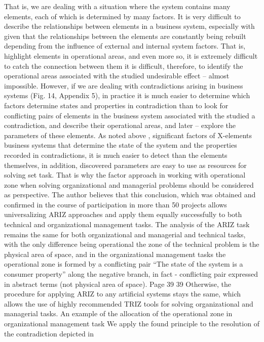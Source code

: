 That is, we are dealing with a situation where the system contains many
elements, each of which is determined by many factors.
It is very difficult to describe the relationships between elements in a business system, especially with
given that the relationships between the elements are constantly being rebuilt depending
from the influence of external and internal system factors. That is, highlight
elements in operational areas, and even more so, it is extremely difficult to catch the connection between them
it is difficult, therefore, to identify the operational areas associated with the studied
undesirable effect -- almost impossible.
However, if we are dealing with contradictions arising in business
systems (Fig. 14, Appendix 5), in practice it is much easier to determine which
factors determine states and properties in contradiction than to look for
conflicting pairs of elements in the business system associated with the studied
a contradiction, and describe their operational areas, and later -- explore the parameters
of these elements. As noted above , significant factors of X-elements
business systems that determine the state of the system and the properties recorded in
contradictions, it is much easier to detect than the elements themselves, in addition,
discovered parameters are easy to use as resources for solving
set task. That is why the factor approach in working with operational
zone when solving organizational and managerial problems should be considered as
perspective.
The author believes that this conclusion, which was obtained and confirmed in
the course of participation in more than 50 projects allows universalizing ARIZ approaches
and apply them equally successfully to both technical and organizational
management tasks.
The analysis of the ARIZ task remains the same for both organizational and
managerial and technical tasks, with the only difference being operational
the zone of the technical problem is the physical area of ​​space, and in the organizational
management tasks the operational zone is formed by a conflicting pair
“The state of the system is a consumer property” along the negative branch, in fact -
conflicting pair expressed in abstract terms (not physical
area of ​​space).
Page 39
39
Otherwise, the procedure for applying ARIZ to any artificial systems
stays the same, which allows the use of highly recommended
TRIZ tools for solving organizational and managerial tasks.
An example of the allocation of the operational zone in organizational
management task
We apply the found principle to the resolution of the contradiction depicted in
